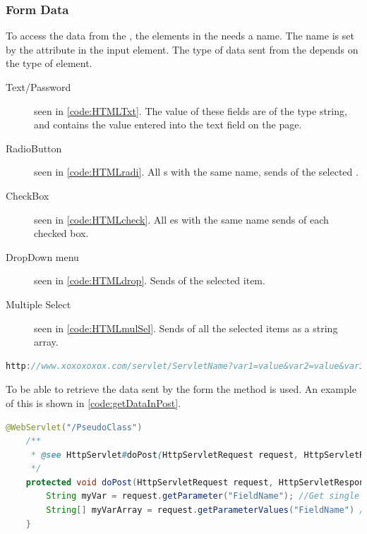 \subsubsection{Form Data}
To access the data from the , the elements in the  needs a name. The name is set by the  attribute in the input element. The type of data sent from the  depends on the type of element.
\begin{description}
	\item[Text/Password] seen in \autoref{code:HTMLTxt}. The value of these fields are of the type string, and contains the value entered into the text field on the page.
	\item[RadioButton] seen in \autoref{code:HTMLradi}. All s with the same name, sends  of the selected .
	\item[CheckBox] seen in \autoref{code:HTMLcheck}. All es with the same name sends  of each checked box.
	\item[DropDown menu] seen in \autoref{code:HTMLdrop}. Sends  of the selected item.
	\item[Multiple Select] seen in \autoref{code:HTMLmulSel}. Sends  of all the selected items as a string array.
\end{description}

\begin{lstlisting}[language=Java,label=code:URLLINK,caption=URL with visible parameters]
http://www.xoxoxoxox.com/servlet/ServletName?var1=value&var2=value&var3=value
\end{lstlisting}

To be able to retrieve the data sent by the form the  method is used. An example of this is shown in \autoref{code:getDataInPost}.

\begin{lstlisting}[language=Java,label=code:getDataInPost,caption=How to read parameters]
	@WebServlet("/PseudoClass")
	/**
	 * @see HttpServlet#doPost(HttpServletRequest request, HttpServletResponse response)
	 */
	protected void doPost(HttpServletRequest request, HttpServletResponse response) throws ServletException, IOException {
		String myVar = request.getParameter("FieldName"); //Get single Value
		String[] myVarArray = request.getParameterValues("FieldName") //Get string array
	}
\end{lstlisting}

